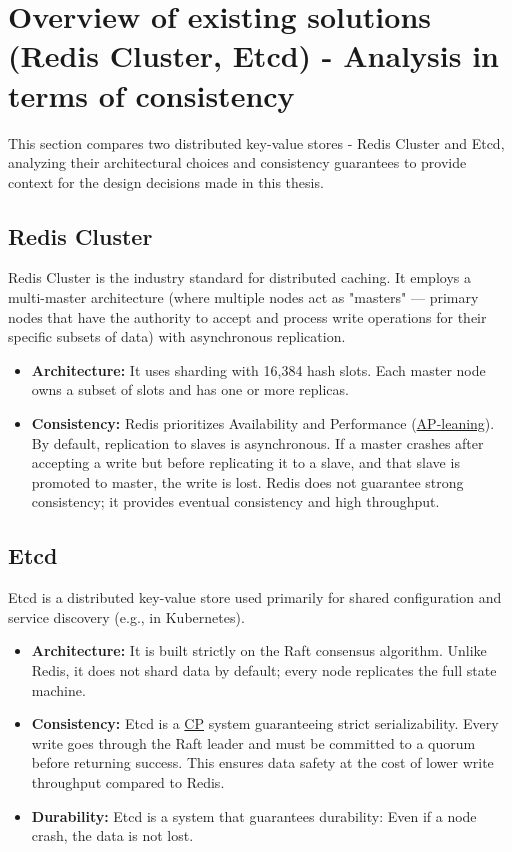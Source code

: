 \documentclass[shortabstract]{iithesis}
\begin{document}
\section{Overview of existing solutions (Redis Cluster, Etcd) - Analysis in terms of consistency}
This section compares two distributed key-value stores - Redis Cluster and Etcd, analyzing their architectural choices and consistency guarantees to provide context for the design decisions made in this thesis.

\subsection{Redis Cluster}
Redis Cluster is the industry standard for distributed caching. It employs a multi-master architecture (where multiple nodes act as "masters" — primary nodes that have the authority to accept and process write operations for their specific subsets of data) with asynchronous replication.
\begin{itemize}
    \item \textbf{Architecture:} It uses sharding with 16,384 hash slots. Each master node owns a subset of slots and has one or more replicas.
    \item \textbf{Consistency:} Redis prioritizes Availability and Performance (\hyperref[def:ap]{AP-leaning}). By default, replication to slaves is asynchronous. If a master crashes after accepting a write but before replicating it to a slave, and that slave is promoted to master, the write is lost. Redis does not guarantee strong consistency; it provides eventual consistency and high throughput.
\end{itemize}

\subsection{Etcd}
Etcd is a distributed key-value store used primarily for shared configuration and service discovery (e.g., in Kubernetes).
\begin{itemize}
    \item \textbf{Architecture:} It is built strictly on the Raft consensus algorithm. Unlike Redis, it does not shard data by default; every node replicates the full state machine.
    \item \textbf{Consistency:} Etcd is a \hyperref[def:cp]{CP} system guaranteeing strict serializability. Every write goes through the Raft leader and must be committed to a quorum before returning success. This ensures data safety at the cost of lower write throughput compared to Redis.
    \item \textbf{Durability:} Etcd is a system that guarantees durability: Even if a node crash, the data is not lost.
\end{itemize}
\end{document}
